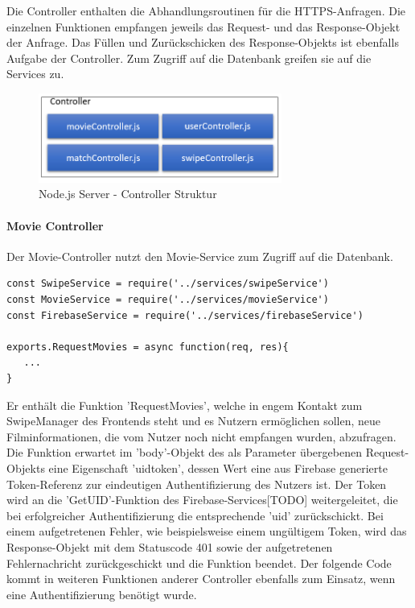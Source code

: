 Die Controller enthalten die Abhandlungsroutinen für die HTTPS-Anfragen. Die einzelnen Funktionen empfangen jeweils das Request- und das Response-Objekt der Anfrage. Das Füllen und Zurückschicken des Response-Objekts ist ebenfalls Aufgabe der Controller. Zum Zugriff auf die Datenbank greifen sie auf die Services zu.



\begin{figure}[h]
\centering
\includegraphics[width=8cm]{images/controllerStruktur.PNG}
\caption{Node.js Server - Controller Struktur}
\end{figure}

\paragraph{Movie Controller}

Der Movie-Controller nutzt den Movie-Service zum Zugriff auf die Datenbank. 
\begin{lstlisting}[caption=movieController.js Imports und Funktionen, label=lst:movieController.js]
const SwipeService = require('../services/swipeService')
const MovieService = require('../services/movieService')
const FirebaseService = require('../services/firebaseService')

exports.RequestMovies = async function(req, res){
   ...
}
\end{lstlisting}

\noindent
Er enthält die Funktion 'RequestMovies', welche in engem Kontakt zum SwipeManager des Frontends steht und es Nutzern ermöglichen sollen, neue Filminformationen, die vom Nutzer noch nicht empfangen wurden, abzufragen.
\newline
Die Funktion erwartet im 'body'-Objekt des als Parameter übergebenen Request-Objekts eine Eigenschaft 'uidtoken', dessen Wert eine aus Firebase generierte Token-Referenz zur eindeutigen Authentifizierung des Nutzers ist. Der Token wird an die 'GetUID'-Funktion des Firebase-Services[TODO] weitergeleitet, die bei erfolgreicher Authentifizierung die entsprechende 'uid' zurückschickt. Bei einem aufgetretenen Fehler, wie beispielsweise einem ungültigem Token, wird das Response-Objekt mit dem Statuscode 401 sowie der aufgetretenen Fehlernachricht zurückgeschickt und die Funktion beendet. Der folgende Code kommt in weiteren Funktionen anderer Controller ebenfalls zum Einsatz, wenn eine Authentifizierung benötigt wurde.

